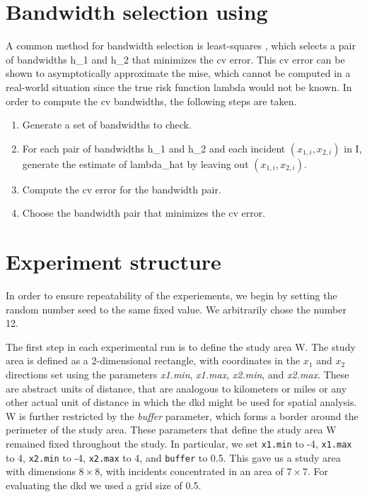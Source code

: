 \section{Bandwidth selection using }
\label{sec:method:cross-validation}

A common method for bandwidth selection is least-squares ,
which selects a pair of bandwidths \gls{h_1} and \gls{h_2} that minimizes the \gls{cv} error.
This \gls{cv} error can be shown to asymptotically approximate the \gls{mise},
which cannot be computed in a real-world situation since the true risk function \gls{lambda} would not be known.
In order to compute the \gls{cv} bandwidths, the following steps are taken.
\begin{enumerate}
    \item Generate a set of bandwidths to check.
    \item For each pair of bandwidths \gls{h_1} and \gls{h_2} and each incident $(x_{1,i}, x_{2,i})$ in \gls{I}, generate the estimate of \gls{lambda_hat} by leaving out $(x_{1,i}, x_{2,i})$.
    \item Compute the \gls{cv} error for the bandwidth pair.
    \item Choose the bandwidth pair that minimizes the \gls{cv} error.
\end{enumerate}


\section{Experiment structure}
\label{sec:method:experiment_structure}

In order to ensure repeatability of the experiements, we begin by setting the random number seed to the same fixed value.
We arbitrarily chose the number 12.

The first step in each experimental run is to define the study area \gls{W}. 
The study area is defined as a 2-dimensional rectangle, with coordinates in the $x_1$ and $x_2$ directions set using the parameters \textit{x1.min}, \textit{x1.max}, \textit{x2.min}, and \textit{x2.max}.
These are abstract units of distance, that are analogous to kilometers or miles or any other actual unit of distance in which the \gls{dkd} might be used for spatial analysis.
\Gls{W} is further restricted by the \textit{buffer} parameter, which forms a border around the perimeter of the study area.
These parameters that define the study area \gls{W} remained fixed throughout the study.
In particular, we set \texttt{x1.min} to -4, \texttt{x1.max} to 4, \texttt{x2.min} to -4, \texttt{x2.max} to 4, and \texttt{buffer} to 0.5.
This gave us a study area with dimensions $8 \times 8$, with incidents concentrated in an area of $7 \times 7$.
For evaluating the \gls{dkd} we used a grid size of 0.5.


